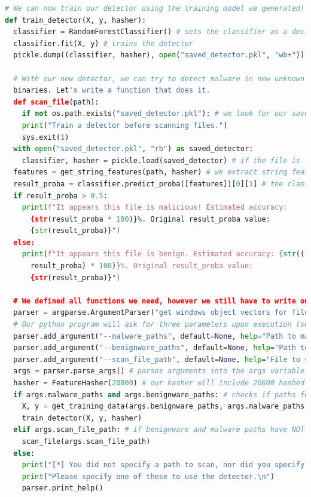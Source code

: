 \documentclass[]{project_plan}
\begin{document}
\begin{lstlisting}[language=python]
# We can now train our detector using the training model we generated!
def train_detector(X, y, hasher):
  classifier = RandomForestClassifier() # sets the classifier as a decision tree that improves predictive accuracy and controls over-fitting
  classifier.fit(X, y) # trains the detector
  pickle.dump((classifier, hasher), open("saved_detector.pkl", "wb+")) # we save the detector in the saved_detector.pkl file, for future use

  # With our new detector, we can try to detect malware in new unknown
  binaries. Let's write a function that does it.
  def scan_file(path):
    if not os.path.exists("saved_detector.pkl"): # we look for our saved detector, and exit if we don't find it
    print("Train a detector before scanning files.")
    sys.exit(1)
  with open("saved_detector.pkl", "rb") as saved_detector:
    classifier, hasher = pickle.load(saved_detector) # if the file is found, classifier and hasher are loaded from the pickle file
  features = get_string_features(path, hasher) # we extract string features from the unknown binary
  result_proba = classifier.predict_proba([features])[0][1] # the classifier tries to infer whether the binary is malicious or not, given the extracted features. The second value of the first element (i.e. [0][1]) from the returned array corresponds to such probability
  if result_proba > 0.5:
    print(f"It appears this file is malicious! Estimated accuracy:
      {str(result_proba * 100)}%. Original result_proba value:
      {str(result_proba)}")
  else:
    print(f"It appears this file is benign. Estimated accuracy: {str((1 -
      result_proba) * 100)}%. Original result_proba value:
      {str(result_proba)}")

  # We defined all functions we need, however we still have to write our core program that calls them.
  parser = argparse.ArgumentParser("get windows object vectors for files")
  # Our python program will ask for three parameters upon execution (see "help=" field):
  parser.add_argument("--malware_paths", default=None, help="Path to malware training files")
  parser.add_argument("--benignware_paths", default=None, help="Path to benignware training files")
  parser.add_argument("--scan_file_path", default=None, help="File to scan")
  args = parser.parse_args() # parses arguments into the args variable
  hasher = FeatureHasher(20000) # our hasher will include 20000 hashed features when performing the hashing trick
  if args.malware_paths and args.benignware_paths: # checks if paths for both malware and benignware training samples have been specified
    X, y = get_training_data(args.benignware_paths, args.malware_paths, hasher)
    train_detector(X, y, hasher)
  elif args.scan_file_path: # if benignware and malware paths have NOT been specified, checks if path for the unknown binary has been specified
    scan_file(args.scan_file_path)
  else:
    print("[*] You did not specify a path to scan, nor did you specify paths to malicious and benign training files.")
    print("Please specify one of these to use the detector.\n")
    parser.print_help()
\end{lstlisting}
\end{document}
